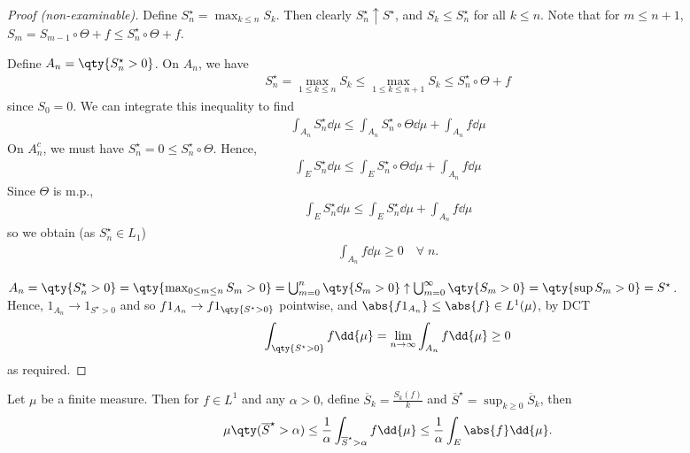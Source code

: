 \begin{proof}[Proof (non-examinable)]
    Define $S_n^\star = \max_{k \leq n} S_k$.
    Then clearly $S_n^\star \uparrow S^\star$, and $S_k \leq S_n^\star$ for all $k \leq n$.
    Note that for $m \leq n+1$, $S_m = S_{m-1} \circ \Theta + f \leq S_n^\star \circ \Theta + f$.

    Define $A_n = \qty{S_n^\star > 0}$.
    On $A_n$, we have
    \begin{align*}
        S_n^\star = \max_{1 \leq k \leq n} S_k \leq \max_{1 \leq k \leq n+1} S_k \leq S_n^\star \circ \Theta + f
    \end{align*}
    since $S_0 = 0$.
    We can integrate this inequality to find
    \begin{align*}
        \int_{A_n} S_n^\star \dd{\mu} \leq \int_{A_n} S_n^\star \circ \Theta \dd{\mu} + \int_{A_n} f \dd{\mu}
    \end{align*}
    On $A_n^c$, we must have $S_n^\star = 0 \leq S_n^\star \circ \Theta$.
    Hence,
    \begin{align*}
        \int_E S_n^\star \dd{\mu} \leq \int_E S_n^\star \circ \Theta \dd{\mu} + \int_{A_n} f \dd{\mu}
    \end{align*}
    Since $\Theta$ is m.p.,
    \begin{align*}
        \int_E S_n^\star \dd{\mu} \leq \int_E S_n^\star \dd{\mu} + \int_{A_n} f \dd{\mu}
    \end{align*}
    so we obtain (as $S_n^\star \in L_1$)
    \begin{align*}
        \int_{A_n} f \dd{\mu} \geq 0 \quad \forall \; n.
    \end{align*}

	$A_n = \qty{S_n^\star > 0} = \qty{\max_{0 \leq m \leq n} S_m > 0} = \bigcup_{m = 0}^n \qty{S_m > 0} \uparrow \bigcup_{m = 0}^\infty \qty{S_m > 0} = \qty{\sup S_m > 0} = S^\star$. \\
	Hence, $1_{A_n} \to 1_{S^\star > 0}$ and so $f 1_{A_n} \to f 1_{\qty{S^\star > 0}}$ pointwise, and $\abs{f 1_{A_n}} \leq \abs{f} \in L^1(\mu)$, by DCT
    \begin{align*}
        \int_{\qty{S^\star > 0}} f \dd{\mu} = \lim_{n \to \infty} \int_{A_n} f \dd{\mu} \geq 0
    \end{align*}
    as required.
\end{proof}

\begin{remark}
	Let $\mu$ be a finite measure.
	Then for $f \in L^1$ and any $\alpha > 0$, define $\overline S_k = \frac{S_k(f)}{k}$ and $\overline S^\star = \sup_{k \geq 0} \overline S_k$, then
	\begin{align*}
		\mu\qty(\overline S^\star > \alpha) \leq \frac{1}{\alpha} \int_{\overline S^\star > \alpha} f \dd{\mu} \leq \frac{1}{\alpha} \int_E \abs{f} \dd{\mu}.
	\end{align*}
\end{remark}


